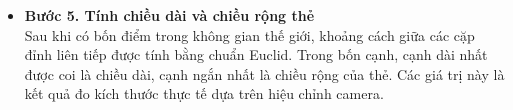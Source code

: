\begin{itemize}
                    \texttt{pixel\_to\_world\_on\_plane()}. Hàm này triển khai công thức nghịch $M_w = R^{-1}(K^{-1} \cdot z_{cam} \cdot m_p - T)$, trong đó $z_{cam}$ được giải bằng cách áp điều kiện $Z_w = 0$. Kết quả là toạ độ $(X_w, Y_w, Z_w)$ của từng góc trong hệ thế giới, đơn vị mm.
                    \item \textbf{Bước 5. Tính chiều dài và chiều rộng thẻ}\\
                    \hspace*{0.6cm}Sau khi có bốn điểm trong không gian thế giới, khoảng cách giữa các cặp đỉnh liên tiếp được tính bằng chuẩn Euclid. Trong bốn cạnh, cạnh dài nhất được coi là chiều dài, cạnh ngắn nhất là chiều rộng của thẻ. Các giá trị này là kết quả đo kích thước thực tế dựa trên hiệu chỉnh camera.
               \end{itemize}
